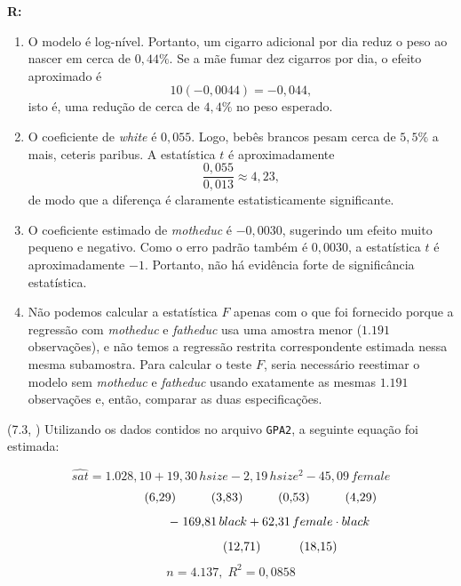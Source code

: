 \documentclass[12pt,letterpaper, onecolumn]{exam}
\renewenvironment{solution}
{\par\noindent\textbf{R:}\enspace\color{blue}}
{\par\color{black}}
\begin{document}
\begin{questions}
\begin{solution}
\begin{enumerate}[label=(\roman*)]
    \item O modelo é log-nível. Portanto, um cigarro adicional por dia reduz o peso ao nascer em cerca de \(0,44\%\). Se a mãe fumar dez cigarros por dia, o efeito aproximado é
    \[
    10(-0,0044) = -0,044,
    \]
    isto é, uma redução de cerca de \(4,4\%\) no peso esperado.

    \item O coeficiente de \textit{white} é \(0,055\). Logo, bebês brancos pesam cerca de \(5,5\%\) a mais, ceteris paribus. A estatística \(t\) é aproximadamente
    \[
    \frac{0,055}{0,013}\approx 4,23,
    \]
    de modo que a diferença é claramente estatisticamente significante.

    \item O coeficiente estimado de \textit{motheduc} é \(-0,0030\), sugerindo um efeito muito pequeno e negativo. Como o erro padrão também é \(0,0030\), a estatística \(t\) é aproximadamente \(-1\). Portanto, não há evidência forte de significância estatística.

    \item Não podemos calcular a estatística \(F\) apenas com o que foi fornecido porque a regressão com \textit{motheduc} e \textit{fatheduc} usa uma amostra menor (\(1.191\) observações), e não temos a regressão restrita correspondente estimada nessa mesma subamostra. Para calcular o teste \(F\), seria necessário reestimar o modelo sem \textit{motheduc} e \textit{fatheduc} usando exatamente as mesmas \(1.191\) observações e, então, comparar as duas especificações.
\end{enumerate}
\end{solution}

\vspace{0.7cm}

\question (7.3, \citep{wooldridge2016}) Utilizando os dados contidos no arquivo \texttt{GPA2}, a seguinte equação foi estimada:

\[
\widehat{sat} = 1{.}028{,}10 + 19{,}30\,hsize - 2{,}19\,hsize^2 - 45{,}09\,female
\]
\[
\hspace{1.7cm} (6{,}29)\hspace{1.0cm}(3{,}83)\hspace{1.0cm}(0{,}53)\hspace{1.0cm}(4{,}29)
\]
\[
\hspace{2.2cm} -\; 169{,}81\,black + 62{,}31\,female \cdot black
\]
\[
\hspace{2.8cm} (12{,}71)\hspace{1.1cm}(18{,}15)
\]
\[
n = 4{.}137,\; R^2 = 0{,}0858
\]


\end{questions}
\end{document}
